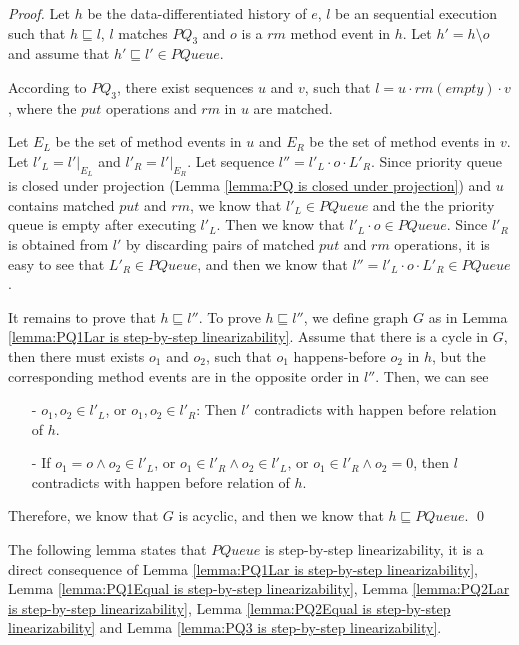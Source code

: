 \begin {proof}
Let $h$ be the data-differentiated history of $e$, $l$ be an sequential execution such that $h \sqsubseteq l$, $l$ matches $\textit{PQ}_3$ and $o$ is a $\textit{rm}$ method event in $h$. Let $h'=h \setminus o$ and assume that $h' \sqsubseteq l' \in \textit{PQueue}$.

According to $\textit{PQ}_3$, there exist sequences $u$ and $v$, such that $l=u \cdot \textit{rm}(\textit{empty}) \cdot v$, where the $\textit{put}$ operations and $\textit{rm}$ in $u$ are matched.

Let $E_L$ be the set of method events in $u$ and $E_R$ be the set of method events in $v$. Let $l'_L = l' \vert_{E_L}$ and $l'_R = l' \vert_{E_R}$. Let sequence $l'' = l'_L \cdot o \cdot L'_R$. Since priority queue is closed under projection (Lemma \ref{lemma:PQ is closed under projection}) and $u$ contains matched $\textit{put}$ and $\textit{rm}$, we know that $l'_L \in \textit{PQueue}$ and the the priority queue is empty after executing $l'_L$. Then we know that $l'_L \cdot o \in \textit{PQueue}$. Since $l'_R$ is obtained from $l'$ by discarding pairs of matched $\textit{put}$ and $\textit{rm}$ operations, it is easy to see that $L'_R \in \textit{PQueue}$, and then we know that $l'' = l'_L \cdot o \cdot L'_R \in \textit{PQueue}$.

It remains to prove that $h \sqsubseteq l''$. To prove $h \sqsubseteq l''$, we define graph $G$ as in Lemma \ref{lemma:PQ1Lar is step-by-step linearizability}. Assume that there is a cycle in $G$, then there must exists $o_1$ and $o_2$, such that $o_1$ happens-before $o_2$ in $h$, but the corresponding method events are in the opposite order in $l''$. Then, we can see

\begin{itemize}
\setlength{\itemsep}{0.5pt}
\item[-] $o_1,o_2 \in l'_L$, or $o_1,o_2 \in l'_R$: Then $l'$ contradicts with happen before relation of $h$.

\item[-] If $o_1=o \wedge o_2 \in l'_L$, or $o_1 \in l'_R \wedge o_2 \in l'_L$, or $o_1 \in l'_R \wedge o_2 = 0$, then $l$ contradicts with happen before relation of $h$.
\end{itemize}

Therefore, we know that $G$ is acyclic, and then we know that $h \sqsubseteq \textit{PQueue}$. \qed
\end {proof}

The following lemma states that $\textit{PQueue}$ is step-by-step linearizability, it is a direct consequence of Lemma \ref{lemma:PQ1Lar is step-by-step linearizability}, Lemma \ref{lemma:PQ1Equal is step-by-step linearizability}, Lemma \ref{lemma:PQ2Lar is step-by-step linearizability}, Lemma \ref{lemma:PQ2Equal is step-by-step linearizability} and Lemma \ref{lemma:PQ3 is step-by-step linearizability}.


